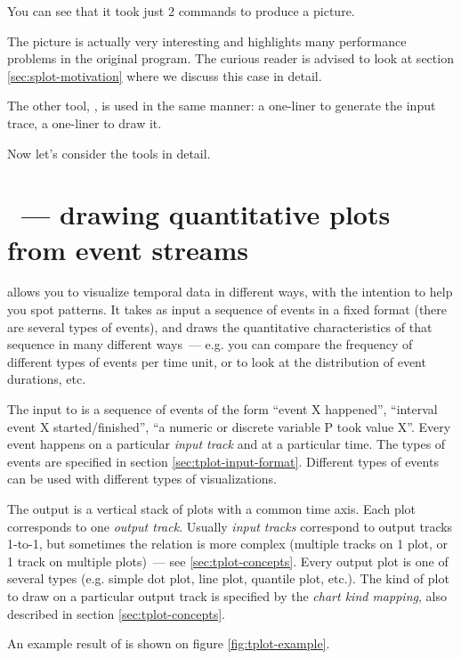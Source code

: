 \documentclass{article}
\begin{document}
You can see that it took just 2 commands to produce a picture.

The picture is actually very interesting and highlights many performance problems in the original program. The curious reader is advised to look at section \ref{sec:splot-motivation} where we discuss this case in detail.

The other tool, \timeplot{}, is used in the same manner: a one-liner to generate the input trace, a one-liner to draw it.

Now let's consider the tools in detail.

\pagebreak
\section{\timeplot{}~--- drawing quantitative plots from event streams}

\timeplot{} allows you to visualize temporal data in different ways, with the intention to help you spot patterns. It takes as input a sequence of events in a fixed format (there are several types of events), and draws the quantitative characteristics of that sequence in many different ways~--- e.g. you can compare the frequency of different types of events per time unit, or to look at the distribution of event durations, etc.

The input to \timeplot{} is a sequence of events of the form ``event X happened'', ``interval event X started/finished'', ``a numeric or discrete variable P took value X''. Every event happens on a particular \emph{input track} and at a particular time. The types of events are specified in section \ref{sec:tplot-input-format}. Different types of events can be used with different types of visualizations.

The output is a vertical stack of plots with a common time axis. Each plot corresponds to one \emph{output track}. Usually \emph{input tracks} correspond to output tracks 1-to-1, but sometimes the relation is more complex (multiple tracks on 1 plot, or 1 track on multiple plots)~--- see \ref{sec:tplot-concepts}. Every output plot is one of several types (e.g. simple dot plot, line plot, quantile plot, etc.). The kind of plot to draw on a particular output track is specified by the \emph{chart kind mapping}, also described in section \ref{sec:tplot-concepts}.

An example result of \timeplot{} is shown on figure \ref{fig:tplot-example}.
\end{document}
